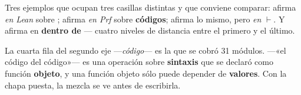\medskip\noindent Tres ejemplos que ocupan tres casillas distintas y que conviene comparar:
 afirma \emph{en Lean} sobre ;
 afirma \emph{en Prf} sobre \textbf{códigos};
 afirma lo mismo, pero \emph{en} $\vdash$.
Y  afirma en  \textbf{dentro de}  — cuatro niveles de
distancia entre el primero y el último.

\begin{leccion}
La cuarta fila del segundo eje —\emph{código}— es la que se cobró 31 módulos.  —«el código del
código»— es una operación sobre \textbf{sintaxis} que se declaró como función \textbf{objeto}, y
una función objeto sólo puede depender de \textbf{valores}. Con la chapa puesta, la mezcla se ve
antes de escribirla.
\end{leccion}

